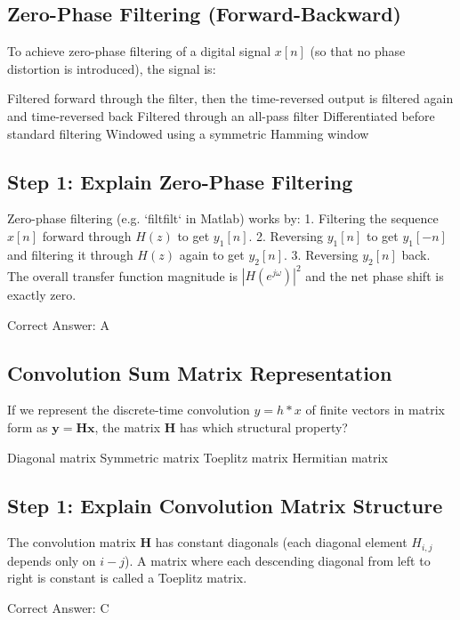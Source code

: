 \clearpage

\subsection{Zero-Phase Filtering (Forward-Backward)}

To achieve zero-phase filtering of a digital signal $x[n]$ (so that no phase distortion is introduced), the signal is:

\begin{choices}
    \correctchoice Filtered forward through the filter, then the time-reversed output is filtered again and time-reversed back
    \choice Filtered through an all-pass filter
    \choice Differentiated before standard filtering
    \choice Windowed using a symmetric Hamming window
\end{choices}

\begin{solution}

\subsection*{Step 1: Explain Zero-Phase Filtering}
Zero-phase filtering (e.g. `filtfilt` in Matlab) works by:
1. Filtering the sequence $x[n]$ forward through $H(z)$ to get $y_1[n]$.
2. Reversing $y_1[n]$ to get $y_1[-n]$ and filtering it through $H(z)$ again to get $y_2[n]$.
3. Reversing $y_2[n]$ back.
The overall transfer function magnitude is $|H(e^{j\omega})|^2$ and the net phase shift is exactly zero.

Correct Answer: A
\end{solution}

\clearpage

\subsection{Convolution Sum Matrix Representation}

If we represent the discrete-time convolution $y = h * x$ of finite vectors in matrix form as $\mathbf{y} = \mathbf{H}\mathbf{x}$, the matrix $\mathbf{H}$ has which structural property?

\begin{choices}
    \choice Diagonal matrix
    \choice Symmetric matrix
    \correctchoice Toeplitz matrix
    \choice Hermitian matrix
\end{choices}

\begin{solution}

\subsection*{Step 1: Explain Convolution Matrix Structure}
The convolution matrix $\mathbf{H}$ has constant diagonals (each diagonal element $H_{i,j}$ depends only on $i - j$). A matrix where each descending diagonal from left to right is constant is called a Toeplitz matrix.

Correct Answer: C
\end{solution}

